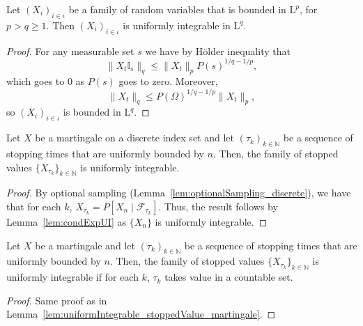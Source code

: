 \begin{lemma}\label{lem:uniformIntegrable_of_bounded}
  \leanok
Let $(X_i)_{i \in \iota}$ be a family of random variables that is bounded in $\mathrm L^p$, for $p > q \ge 1$. Then $(X_i)_{i \in \iota}$ is uniformly integrable in $\mathrm L^q$.
\end{lemma}

\begin{proof}\leanok
  For any measurable set $s$ we have by Hölder inequality that
  $$\|X_t \mathbb{I}_s\|_q \le \|X_t\|_p P(s)^{1/q - 1/p},$$
  which goes to $0$ as $P(s)$ goes to zero. Moreover,
  $$\|X_t\|_q \le P(\Omega)^{1/q - 1/p} \|X_t\|_p,$$
  so $(X_i)_{i \in \iota}$ is bounded in $\mathrm L^q$.
\end{proof}


\begin{lemma}\label{lem:uniformIntegrable_stoppedValue_martingale}
  \leanok
Let $X$ be a martingale on a discrete index set and let $(\tau_k)_{k \in \mathbb{N}}$ be a sequence of stopping times that are uniformly bounded by $n$.
Then, the family of stopped values $\{X_{\tau_k}\}_{k \in \mathbb{N}}$ is uniformly integrable.
\end{lemma}

\begin{proof}
  \leanok
By optional sampling (Lemma~\ref{lem:optionalSampling_discrete}), we have that for each $k$, $X_{\tau_k} = P[X_n \mid \mathcal{F}_{\tau_k}]$.
Thus, the result follows by Lemma~\ref{lem:condExpUI} as $\{X_n\}$ is uniformly integrable.
\end{proof}


\begin{lemma}\label{lem:uniformIntegrable_stoppedValue_martingale_of_countable_range}
  \leanok
Let $X$ be a martingale and let $(\tau_k)_{k \in \mathbb{N}}$ be a sequence of stopping times that are uniformly bounded by $n$.
Then, the family of stopped values $\{X_{\tau_k}\}_{k \in \mathbb{N}}$ is uniformly integrable if for each $k$, $\tau_k$ takes value in a countable set.
\end{lemma}

\begin{proof}
  \leanok
  Same proof as in Lemma~\ref{lem:uniformIntegrable_stoppedValue_martingale}.
\end{proof}


